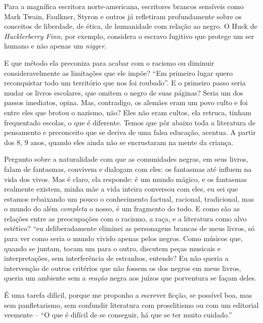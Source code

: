 \documentclass[
  letterpaper,
  DIV=11,
  numbers=noendperiod]{scrreprt}
\begin{document}
Para a magnífica escritora norte-americana, escritores brancos sensíveis
como Mark Twain, Faulkner, Styron e outros já refletiram profundamente
sobre os conceitos de liberdade, de ética, de humanidade com relação ao
negro. O Huck de \emph{Hucklerberry Finn}, por exemplo, considera o
escravo fugitivo que protege um ser humano e não apenas um
\emph{nigger}.

E que método ela preconiza para acabar com o racismo ou diminuir
consideravelmente as limitações que ele impõe? ``Em primeiro lugar quero
reconquistar todo um território que nos foi roubado''. E o primeiro
passo seria mudar os livros escolares, que omitem o negro de suas
páginas? Seria um dos passos imediatos, opina. Mas, contradigo, os
alemães eram um povo culto e foi entre eles que brotou o nazismo, não?
Eles não eram cultos, ela retruca, tinham frequentado escolas, o que é
diferente. Temos que pôr abaixo toda a literatura de pensamento e
preconceito que se deriva de uma falsa educação, acentua. A partir dos
8, 9 anos, quando eles ainda não se encrustaram na mente da criança.

Pergunto sobre a naturalidade com que as comunidades negras, em seus
livros, falam de fantasmas, convivem e dialogam com eles: os fantasmas
até influem na vida dos vivos. Mas é claro, ela responde: é um mundo
mágico, e os fantasmas realmente existem, minha mãe a vida inteira
conversou com eles, eu sei que estamos rebaixando um pouco o
conhecimento factual, racional, tradicional, mas o mundo do além
\emph{completa} o nosso, é um fragmento do todo. E como são as relações
entre as preocupações com o racismo, a raça, e a literatura como alvo
estético? ``eu deliberadamente eliminei as personagens brancas de meus
livros, só para ver como seria o mundo vivido apenas pelos negros. Como
músicos que, quando se juntam, tocam um para o outro, discutem peças
musicais e interpretações, sem interferência de estranhos, entende? Eu
não queria a intervenção de outros critérios que não fossem os dos
negros em meus livros, queria um ambiente sem a \emph{reação} negra aos
juízos que porventura se façam deles.

É uma tarefa difícil, porque me proponho a escrever ficção, se possível
boa, mas sem panfletarismo, sem confundir literatura com proselitismo ou
com um editorial veemente -- ``O que é difícil de se conseguir, há que
se ter muito cuidado.''
\end{document}
